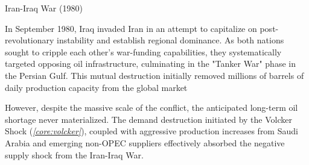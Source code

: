 \documentclass[10pt]{article}
\begin{document}
      \begin{core}{Iran-Iraq War (1980)}

        In September 1980, Iraq invaded Iran in an attempt to capitalize on post-revolutionary instability and establish regional dominance. As both nations sought to cripple each other's war-funding capabilities, they systematically targeted opposing oil infrastructure, culminating in the "Tanker War" phase in the Persian Gulf. This mutual destruction initially removed millions of barrels of daily production capacity from the global market


        However, despite the massive scale of the conflict, the anticipated long-term oil shortage never materialized. The demand destruction initiated by the Volcker Shock (\textit{\autoref{core:volcker}}), coupled with aggressive production increases from Saudi Arabia and emerging non-OPEC suppliers effectively absorbed the negative supply shock from the Iran-Iraq War.

      \end{core}
\end{document}
